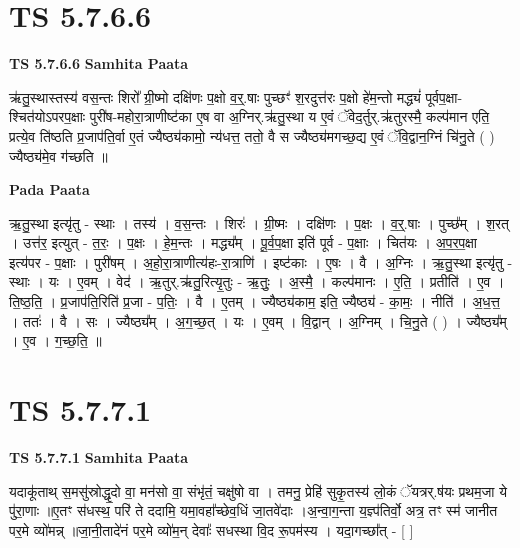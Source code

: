 \documentclass[17pt]{extarticle}
\begin{document}
\section*{ TS 5.7.6.6 }

\textbf{TS 5.7.6.6 } \newline
\textbf{Samhita Paata} \newline

ऋ॑तु॒स्थास्तस्य॑ वस॒न्तः शिरो᳚ ग्री॒ष्मो दक्षि॑णः प॒क्षो व॒र्॒.षाः पुच्छꣳ॑ श॒रदुत्त॑रः प॒क्षो हे॑म॒न्तो मद्ध्यं॑ पूर्वप॒क्षा-श्चित॑योऽपरप॒क्षाः पुरी॑ष-महोरा॒त्राणीष्ट॑का ए॒ष वा अ॒ग्निर्.ऋ॑तु॒स्था य ए॒वं ॅवेद॒र्तुर्.ऋ॑तुरस्मै॒ कल्प॑मान एति॒ प्रत्ये॒व ति॑ष्ठति प्र॒जाप॑ति॒र्वा ए॒तं ज्यैष्ठ्य॑कामो॒ न्य॑धत्त॒ ततो॒ वै स ज्यैष्ठ्य॑मगच्छ॒द्य ए॒वं ॅवि॒द्वान॒ग्निं चि॑नु॒ते ( ) ज्यैष्ठ्य॑मे॒व ग॑च्छति ॥ \newline

\textbf{Pada Paata} \newline

ऋ॒तु॒स्था इत्यृ॑तु - स्थाः । तस्य॑ । व॒स॒न्तः । शिरः॑ । ग्री॒ष्मः । दक्षि॑णः । प॒क्षः । व॒र्॒.षाः । पुच्छ᳚म् । श॒रत् । उत्त॑र॒ इत्युत् - त॒रः॒ । प॒क्षः । हे॒म॒न्तः । मद्ध्य᳚म् । पू॒र्व॒प॒क्षा इति॑ पूर्व - प॒क्षाः । चित॑यः । अ॒प॒र॒प॒क्षा इत्य॑पर - प॒क्षाः । पुरी॑षम् । अ॒हो॒रा॒त्राणीत्य॑हः-रा॒त्राणि॑ । इष्ट॑काः । ए॒षः । वै । अ॒ग्निः । ऋ॒तु॒स्था इत्यृ॑तु - स्थाः । यः । ए॒वम् । वेद॑ । ऋ॒तुर्.ऋ॑तु॒रित्यृ॒तुः - ऋ॒तुः॒ । अ॒स्मै॒ । कल्प॑मानः । ए॒ति॒ । प्रतीति॑ । ए॒व । ति॒ष्ठ॒ति॒ । प्र॒जाप॑ति॒रिति॑ प्र॒जा - प॒तिः॒ । वै । ए॒तम् । ज्यैष्ठ्य॑काम॒ इति॒ ज्यैष्ठ्य॑ - का॒मः॒ । नीति॑ । अ॒ध॒त्त॒ । ततः॑ । वै । सः । ज्यैष्ठ्य᳚म् । अ॒ग॒च्छ॒त् । यः । ए॒वम् । वि॒द्वान् । अ॒ग्निम् । चि॒नु॒ते ( ) । ज्यैष्ठ्य᳚म् । ए॒व । ग॒च्छ॒ति॒ ॥  \newline




\section*{ TS 5.7.7.1 }

\textbf{TS 5.7.7.1 } \newline
\textbf{Samhita Paata} \newline

यदाकू॑ताथ् स॒मसु॑स्रोद्धृ॒दो वा॒ मन॑सो वा॒ संभृ॑तं॒ चक्षु॑षो वा । तमनु॒ प्रेहि॑ सुकृ॒तस्य॑ लो॒कं ॅयत्रर्.ष॑यः प्रथम॒जा ये पु॑रा॒णाः ॥ए॒तꣳ स॑धस्थ॒ परि॑ ते ददामि॒ यमा॒वहा᳚च्छेव॒धिं जा॒तवे॑दाः ।अ॒न्वा॒ग॒न्ता य॒ज्ञ्प॑तिर्वो॒ अत्र॒ तꣳ स्म॑ जानीत पर॒मे व्यो॑मन्न् ॥जा॒नी॒तादे॑नं पर॒मे व्यो॑म॒न् देवाः᳚ सधस्था वि॒द रू॒पम॑स्य । यदा॒गच्छा᳚त् - [  ] \newline
\end{document}
